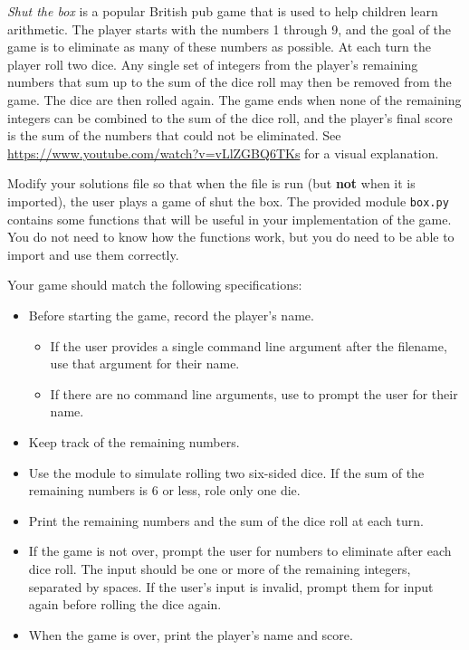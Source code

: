 \begin{problem} %
\emph{Shut the box} is a popular British pub game that is used to help children learn arithmetic.
The player starts with the numbers 1 through 9, and the goal of the game is to eliminate as many of these numbers as possible.
At each turn the player roll two dice.
Any single set of integers from the player's remaining numbers that sum up to the sum of the dice roll may then be removed from the game.
The dice are then rolled again.
The game ends when none of the remaining integers can be combined to the sum of the dice roll, and the player's final score is the sum of the numbers that could not be eliminated.
See \url{https://www.youtube.com/watch?v=vLlZGBQ6TKs} for a visual explanation.

Modify your solutions file so that when the file is run (but \textbf{not} when it is imported), the user plays a game of shut the box.
The provided module \texttt{box.py} contains some functions that will be useful in your implementation of the game.
You do not need to know how the functions work, but you do need to be able to import and use them correctly.

Your game should match the following specifications:

\begin{itemize}
\item Before starting the game, record the player's name.
\begin{itemize}
    \item If the user provides a single command line argument after the filename, use that argument for their name.
    \item If there are no command line arguments, use  to prompt the user for their name.
\end{itemize}
\item Keep track of the remaining numbers.
\item Use the  module to simulate rolling two six-sided dice.
If the sum of the remaining numbers is 6 or less, role only one die.
\item Print the remaining numbers and the sum of the dice roll at each turn. 
\item If the game is not over, prompt the user for numbers to eliminate after each dice roll.
The input should be one or more of the remaining integers, separated by spaces.
If the user's input is invalid, prompt them for input again before rolling the dice again.
\item When the game is over, print the player's name and score.
\end{itemize}


\end{problem}
